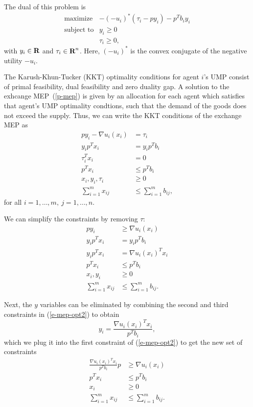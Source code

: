 \documentclass[12pt]{article}
\begin{document}
The dual of this problem is
\[
\begin{array}{ll}
\mbox{maximize} & -(- u_i)^*(\tau_i - p y_i) - p^T b_i y_i\\
\mbox{subject to} & y_i \geq 0\\
& \tau_i \geq 0,
\end{array}
\]
with $y_i \in {\mbox{\bf R}}$ and $\tau_i \in {\mbox{\bf R}}^n$. Here, $(- u_i)^*$
is the convex conjugate of the negative utility $-u_i$.

The Karush-Khun-Tucker (KKT) optimality conditions for agent $i$'s UMP consist of primal feasibility, dual
feasibility and zero duality gap.
A solution to the exhcange MEP~(\ref{p-mep})
is given by an allocation for each agent which satisfies that
agent's UMP optimality condtions, such that the demand of the goods
does not exceed the supply.
Thus, we can write the KKT conditions of the exchange MEP as
\begin{equation}
\begin{aligned}
p y_i - \nabla u_i(x_i)&= \tau_i\\
y_i p^T x_i &= y_i p^T b_i\\
\tau_i^T x_i &= 0\\
p^T x_i &\leq p^T b_i\\
x_i, y_i, \tau_i &\geq 0\\
\sum_{i=1}^m x_{ij} &\leq \sum_{i=1}^m b_{ij},
\end{aligned}
\label{e-mep-opt1}
\end{equation}
for all $i=1,\ldots,m,\ j=1,\ldots,n$.

We can simplify the constraints by removing $\tau$:
\begin{equation}
\begin{aligned}
p y_i &\geq \nabla u_i(x_i) \\
y_i p^T x_i &= y_i p^T b_i \\
y_i p^T x_i &= \nabla u_i(x_i)^T x_i\\
p^T x_i &\leq p^T b_i\\
x_i, y_i &\geq 0\\
\sum_{i=1}^m x_{ij} &\leq \sum_{i=1}^m b_{ij}.
\end{aligned}
\label{e-mep-opt2}
\end{equation}

Next, the $y$ variables can be eliminated by combining the second and third constraints in (\ref{e-mep-opt2})
to obtain
\[
y_i = \frac{\nabla u_i(x_i)^T x_i}{p^T b_i},
\]
which we plug it into the first constraint of (\ref{e-mep-opt2}) to get the new set of constraints
\begin{equation}
\begin{aligned}
\frac{\nabla u_i(x_i)^T x_i}{p^T b_i} p &\geq \nabla u_i(x_i) \\
p^T x_i &\leq p^T b_i\\
x_i &\geq 0\\
\sum_{i=1}^m x_{ij} &\leq \sum_{i=1}^m b_{ij}.
\end{aligned}
\label{e-mep-opt3}
\end{equation}
\end{document}
